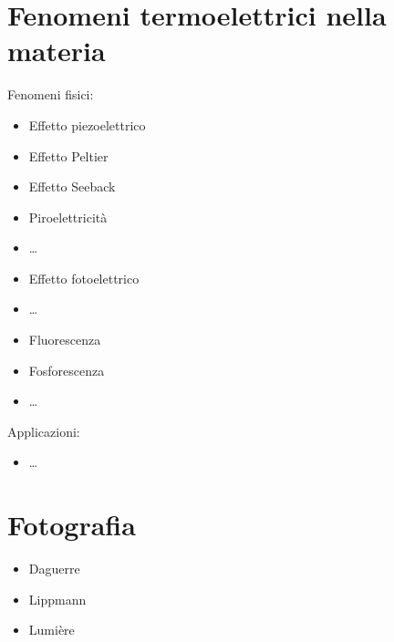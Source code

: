 \documentclass[letterpaper,10pt,italian]{jupyterBook}
\begin{document}
\sphinxstepscope


\chapter{Fenomeni termo\sphinxhyphen{}elettrici nella materia}
\label{\detokenize{ch/modern/intro-coupling:fenomeni-termo-elettrici-nella-materia}}\label{\detokenize{ch/modern/intro-coupling:physics-hs-modern-coupling}}\label{\detokenize{ch/modern/intro-coupling::doc}}
\sphinxAtStartPar
Fenomeni fisici:
\begin{itemize}
\item {} 
\sphinxAtStartPar
Effetto piezoelettrico

\item {} 
\sphinxAtStartPar
Effetto Peltier

\item {} 
\sphinxAtStartPar
Effetto Seeback

\item {} 
\sphinxAtStartPar
Piroelettricità

\item {} 
\sphinxAtStartPar
…

\item {} 
\sphinxAtStartPar
Effetto fotoelettrico

\item {} 
\sphinxAtStartPar
…

\item {} 
\sphinxAtStartPar
Fluorescenza

\item {} 
\sphinxAtStartPar
Fosforescenza

\item {} 
\sphinxAtStartPar
…

\end{itemize}

\sphinxAtStartPar
Applicazioni:
\begin{itemize}
\item {} 
\sphinxAtStartPar
…

\end{itemize}

\sphinxstepscope


\chapter{Fotografia}
\label{\detokenize{ch/modern/intro-photography:fotografia}}\label{\detokenize{ch/modern/intro-photography:physics-hs-modern-photography}}\label{\detokenize{ch/modern/intro-photography::doc}}\begin{itemize}
\item {} 
\sphinxAtStartPar
Daguerre

\item {} 
\sphinxAtStartPar
Lippmann

\item {} 
\sphinxAtStartPar
Lumière

\end{itemize}
\end{document}

